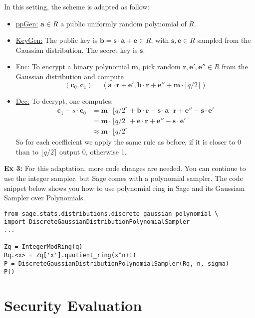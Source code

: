 \documentclass[10pt,a4paper,nobib]{tufte-handout}
\begin{document}
In this setting, the scheme is adapted as follow:
\begin{itemize}
  \item \underline{ppGen:} $\mathbf{a} \in R$ a public uniformly random polynomial of $R$.
  \item \underline{KeyGen:} The public key is $\mathbf{b} = \mathbf{s} \cdot \mathbf{a} + \mathbf{e} \in R$, with $\mathbf{s}, \mathbf{e} \in R$ sampled from the Gaussian distribution. The secret key is $\mathbf{s}$.
  \item \underline{Enc:} To encrypt a binary polynomial $\mathbf{m}$, pick random $\mathbf{r}, \mathbf{e'}, \mathbf{e''} \in R$ from the Gaussian distribution and compute
$$ (\mathbf{c}_0, \mathbf{c}_1) = (\mathbf{a}\cdot\mathbf{r} + \mathbf{e'}, \mathbf{b}\cdot \mathbf{r} + \mathbf{e''} + \mathbf{m} \cdot \lfloor q/2 \rceil) $$
  \item \underline{Dec:}  To decrypt, one computes: 
\begin{align*}
   \mathbf{c}_1 - s \cdot \mathbf{c}_0 &= \mathbf{m} \cdot \lfloor q/2 \rceil + \mathbf{b}\cdot \mathbf{r} - \mathbf{s}\cdot\mathbf{a}\cdot\mathbf{r} + \mathbf{e''} - \mathbf{s}\cdot\mathbf{e'}\\
                                       &= \mathbf{m} \cdot \lfloor q/2 \rceil + \mathbf{e}\cdot \mathbf{r} + \mathbf{e''} - \mathbf{s}\cdot\mathbf{e'} \\
                                       &\approx  \mathbf{m} \cdot \lfloor q/2 \rceil
\end{align*}
So for each coefficient we apply the same rule as before, if it is closer to 0 than to $\lfloor q/2 \rceil$ output 0, otherwise 1. 
\end{itemize}

\textbf{Ex 3:} For this adaptation, more code changes are needed. You can continue to use the integer sampler, but Sage comes with a polynomial sampler. The code snippet below shows you how to use polynomial ring in Sage and its Gaussiam Sampler over Polynomials.
\lstset{language=sage,label= ,caption= ,captionpos=b,numbers=none}
\begin{lstlisting}
from sage.stats.distributions.discrete_gaussian_polynomial \
import DiscreteGaussianDistributionPolynomialSampler
...

Zq = IntegerModRing(q)
Rq.<x> = Zq['x'].quotient_ring(x^n+1)
P = DiscreteGaussianDistributionPolynomialSampler(Rq, n, sigma)
P()
\end{lstlisting}


\section{Security Evaluation}
\end{document}
